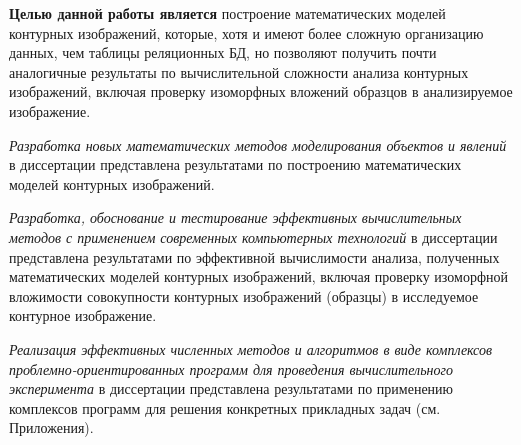 \textbf{Целью данной работы является} построение математических моделей контурных изображений, которые, хотя и имеют более сложную организацию данных, чем  таблицы реляционных БД, но позволяют получить почти аналогичные результаты по вычислительной сложности  анализа контурных изображений, включая проверку изоморфных вложений образцов в анализируемое изображение.
      
\textit{Разработка новых математических методов моделирования объектов и явлений} в диссертации представлена результатами по построению математических моделей контурных изображений.

\textit{Разработка, обоснование и тестирование эффективных вычислительных методов с применением современных компьютерных технологий} в диссертации представлена результатами по эффективной вычислимости анализа, полученных математических моделей контурных изображений, включая проверку изоморфной вложимости совокупности контурных изображений (образцы) в исследуемое контурное изображение.

\textit{Реализация эффективных численных методов и алгоритмов в виде комплексов проблемно-ориентированных программ для проведения вычислительного эксперимента} в диссертации представлена результатами по применению комплексов программ для решения конкретных прикладных задач  (см. Приложения).
\pagebreak

